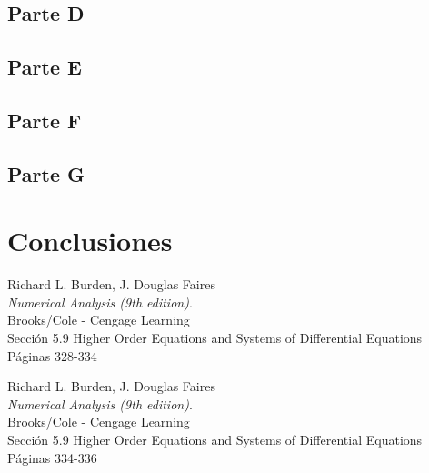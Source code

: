 \documentclass[titlepage,a4paper]{article}
\begin{document}
	\subsection{Parte D}\label{sec:parteD}

	\subsection{Parte E}\label{sec:parteE}

	\subsection{Parte F}\label{sec:parteF}

	\subsection{Parte G}\label{sec:parteG}

\section{Conclusiones}\label{sec:conc}


\begin{thebibliography}{9} 
		Richard L. Burden, J. Douglas Faires\\
		\textit{Numerical Analysis (9th edition)}. \\
		Brooks/Cole - Cengage Learning\\
		Sección 5.9 Higher Order Equations and Systems of Differential Equations\\
		Páginas 328-334

		Richard L. Burden, J. Douglas Faires\\
		\textit{Numerical Analysis (9th edition)}.\\ 
		Brooks/Cole - Cengage Learning\\
		Sección 5.9 Higher Order Equations and Systems of Differential Equations\\
		Páginas 334-336
	 
\end{thebibliography}
\end{document}
